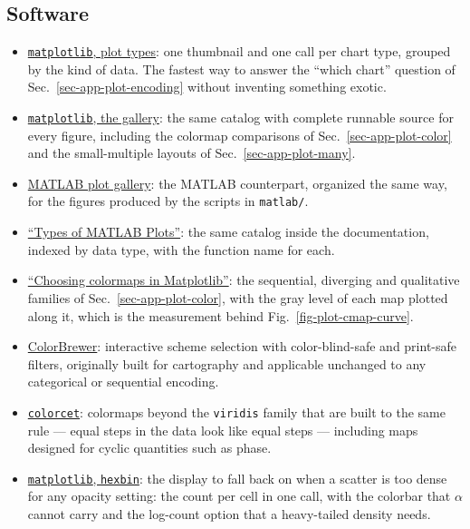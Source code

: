 \subsection*{Software}
\begin{itemize}
	\item \href{https://matplotlib.org/stable/plot_types/index.html}{\texttt{matplotlib}, plot types}: one thumbnail and one call per chart type, grouped by the kind of data. The fastest way to answer the ``which chart'' question of Sec.~\ref{sec-app-plot-encoding} without inventing something exotic.
	\item \href{https://matplotlib.org/stable/gallery/index.html}{\texttt{matplotlib}, the gallery}: the same catalog with complete runnable source for every figure, including the colormap comparisons of Sec.~\ref{sec-app-plot-color} and the small-multiple layouts of Sec.~\ref{sec-app-plot-many}.
	\item \href{https://www.mathworks.com/products/matlab/plot-gallery.html}{MATLAB plot gallery}: the MATLAB counterpart, organized the same way, for the figures produced by the scripts in \texttt{matlab/}.
	\item \href{https://www.mathworks.com/help/matlab/creating_plots/types-of-matlab-plots.html}{``Types of MATLAB Plots''}: the same catalog inside the documentation, indexed by data type, with the function name for each.
	\item \href{https://matplotlib.org/stable/users/explain/colors/colormaps.html}{``Choosing colormaps in Matplotlib''}: the sequential, diverging and qualitative families of Sec.~\ref{sec-app-plot-color}, with the gray level of each map plotted along it, which is the measurement behind Fig.~\ref{fig-plot-cmap-curve}.
	\item \href{https://colorbrewer2.org/}{ColorBrewer}: interactive scheme selection with color-blind-safe and print-safe filters, originally built for cartography and applicable unchanged to any categorical or sequential encoding.
	\item \href{https://colorcet.holoviz.org/}{\texttt{colorcet}}: colormaps beyond the \texttt{viridis} family that are built to the same rule --- equal steps in the data look like equal steps --- including maps designed for cyclic quantities such as phase.
	\item \href{https://matplotlib.org/stable/gallery/statistics/hexbin_demo.html}{\texttt{matplotlib}, \texttt{hexbin}}: the display to fall back on when a scatter is too dense for any opacity setting: the count per cell in one call, with the colorbar that $\alpha$ cannot carry and the log-count option that a heavy-tailed density needs.

\end{itemize}
